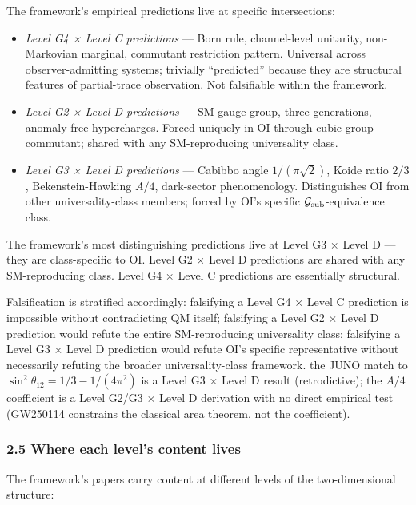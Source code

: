 \documentclass[
]{article}
\providecommand{\tightlist}{%
  \setlength{\itemsep}{0pt}\setlength{\parskip}{0pt}}
\begin{document}
The framework's empirical predictions live at specific intersections:

\begin{itemize}
\tightlist
\item
  \emph{Level G4 × Level C predictions} --- Born rule, channel-level
  unitarity, non-Markovian marginal, commutant restriction pattern.
  Universal across observer-admitting systems; trivially ``predicted''
  because they are structural features of partial-trace observation. Not
  falsifiable within the framework.
\item
  \emph{Level G2 × Level D predictions} --- SM gauge group, three
  generations, anomaly-free hypercharges. Forced uniquely in OI through
  cubic-group commutant; shared with any SM-reproducing universality
  class.
\item
  \emph{Level G3 × Level D predictions} --- Cabibbo angle
  \(1/(\pi\sqrt{2})\), Koide ratio \(2/3\), Bekenstein-Hawking \(A/4\),
  dark-sector phenomenology. Distinguishes OI from other
  universality-class members; forced by OI's specific
  \(\mathcal{G}_{\rm sub}\)-equivalence class.
\end{itemize}

The framework's most distinguishing predictions live at Level G3 × Level
D --- they are class-specific to OI. Level G2 × Level D predictions are
shared with any SM-reproducing class. Level G4 × Level C predictions are
essentially structural.

Falsification is stratified accordingly: falsifying a Level G4 × Level C
prediction is impossible without contradicting QM itself; falsifying a
Level G2 × Level D prediction would refute the entire SM-reproducing
universality class; falsifying a Level G3 × Level D prediction would
refute OI's specific representative without necessarily refuting the
broader universality-class framework. the JUNO match to
\(\sin^2\theta_{12} = 1/3 - 1/(4\pi^2)\) is a Level G3 × Level D result
(retrodictive); the \(A/4\) coefficient is a Level G2/G3 × Level D
derivation with no direct empirical test (GW250114 constrains the
classical area theorem, not the coefficient).

\hypertarget{where-each-levels-content-lives}{%
\subsubsection{2.5 Where each level's content
lives}\label{where-each-levels-content-lives}}

The framework's papers carry content at different levels of the
two-dimensional structure:
\end{document}
